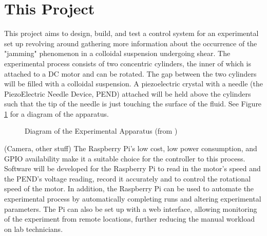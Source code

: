 \documentclass[a4]{report}
\begin{document}
	\section{This Project}
	This project aims to design, build, and test a control system for an experimental set up revolving around gathering more information about the occurrence of the "jamming" phenomenon in a colloidal suspension undergoing shear. The experimental process consists of two concentric cylinders, the inner of which is attached to a DC motor and can be rotated. The gap between the two cylinders will be filled with a colloidal suspension. A piezoelectric crystal with a needle (the PiezoElectric Needle Device, PEND) attached will be held above the cylinders such that the tip of the needle is just touching the surface of the fluid. See Figure \ref{expdia} for a diagram of the apparatus.\newline
	\begin{figure}[!h]
	\centering
	\caption{Diagram of the Experimental Apparatus (from )}
	\label{expdia}
	\end{figure} \newline  \noindent
	(Camera, other stuff) \newline \newline \noindent
	The Raspberry Pi's low cost, low power consumption, and GPIO availability make it a suitable choice for the controller to this process. Software will be developed for the Raspberry Pi to read in the motor's speed and the PEND's voltage reading, record it accurately and to control the rotational speed of the motor. In addition, the Raspberry Pi can be used to automate the experimental process by automatically completing runs and altering experimental parameters. The Pi can also be set up with a web interface, allowing monitoring of the experiment from remote locations, further reducing the manual workload on lab technicians.
\end{document}
